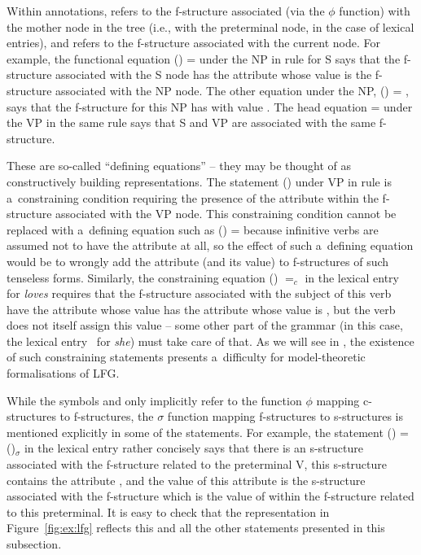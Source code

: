 \documentclass[output=paper,hidelinks]{langscibook}
\begin{document}
\begin{exe}
 
 
 
 
 
 
\end{exe}
Within annotations, \UP refers to the f-structure associated (via the $\phi$ function) with the mother node in the tree (i.e., with the preterminal node, in the case of lexical entries), and \DOWN refers to the f-structure associated with the current node.  For example, the functional equation (\UP\SUBJ) = \DOWN under the NP in rule  for S says that the f-structure associated with the S node has the \SUBJ attribute whose value is the f-structure associated with the NP node.  The other equation under the NP, (\DOWN\CASE) = \NOM, says that the f-structure for this NP has \CASE with value \NOM.  The head equation {\UP} = {\DOWN} under the VP in the same rule says that S and VP are associated with the same f-structure.

These are so-called “defining equations” -- they may be thought of as constructively building representations.  The statement (\DOWN\TENSE) under VP in rule  is a~constraining condition requiring the presence of the \TENSE attribute within the f-structure associated with the VP node.  This constraining condition cannot be replaced with a~defining equation such as (\DOWN\TENSE) = \PRS because infinitive verbs are assumed not to have the \TENSE attribute at all, so the effect of such a~defining equation would be to wrongly add the attribute \TENSE (and its \PRS value) to f-structures of such tenseless forms.  Similarly, the constraining equation (\UP\SUBJ\NINDEX\PERS) $=_c$  in the lexical entry~ for \emph{loves} requires that the f-structure associated with the subject of this verb have the attribute \NINDEX whose value has the attribute \PERS whose value is , but the verb does not itself assign this value -- some other part of the grammar (in this case, the lexical entry~ for \emph{she}) must take care of that.  As we will see in , the existence of such constraining statements presents a~difficulty for model\hyp{}theoretic formalisations of LFG\@.

While the symbols \UP and \DOWN only implicitly refer to the function $\phi$ mapping c-structures to f-structures, the $\sigma$ function mapping f-structures to s-structures is mentioned explicitly in some of the statements.  For example, the statement (\UPS\ARGone) = (\UP\SUBJ)$_\sigma$ in the lexical entry  rather concisely says that there is an s-structure associated with the f-structure related to the preterminal V, this s-structure contains the attribute \ARGone, and the value of this attribute is the s-structure associated with the f-structure which is the value of \SUBJ within the f-structure related to this preterminal.  It is easy to check that the representation in Figure~\ref{fig:ex:lfg} reflects this and all the other statements presented in this subsection.
\end{document}

